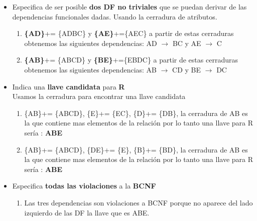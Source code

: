 \documentclass{article}
\begin{document}
\begin{enumerate}
\begin{itemize}
	\item Especifica  de ser posible \textbf{dos DF no triviales} que se puedan derivar de las dependencias funcionales dadas.
	Usando la cerradura de atributos.
	\begin{enumerate}
		\item \textbf{\{AD\}}+= \{ADBC\} y \textbf{\{AE\}}+=\{AEC\} a partir de estas cerraduras obtenemos las siguientes dependencias: AD $\rightarrow$ BC y AE $\rightarrow$ C\\ 
		\item \textbf{\{AB\}}+= \{ABCD\} y \textbf{\{BE\}}+=\{EBDC\} a partir de estas cerraduras obtenemos las siguientes dependencias: AB $\rightarrow$ CD y BE $\rightarrow$ DC\\ 
		 
		
		
	\end{enumerate}
	\item Indica una \textbf{llave candidata} para \textbf{R} \\
	Usamos la cerradura para encontrar una llave candidata
	\begin{enumerate}
		\item \{AB\}+= \{ABCD\}, \{E\}+= \{EC\}, \{D\}+= \{DB\}, la cerradura de AB es la que contiene mas elementos de la relación por lo tanto una llave para R sería : \textbf{ABE}\\ 
		\item \{AB\}+= \{ABCD\}, \{DE\}+= \{E\}, \{B\}+= \{BD\}, la cerradura de AB es la que contiene mas elementos de la relación por lo tanto una llave para R sería : \textbf{ABE}\\ 
		
		
		
	\end{enumerate}
	
	\item Especifica \textbf{todas las violaciones}  a la \textbf{BCNF}\\
	\begin{enumerate}
		\item Las tres dependencias son violaciones a BCNF porque no aparece del lado izquierdo de las DF la llave que es ABE.\\
		

\end{enumerate}
\end{itemize}
\end{enumerate}
\end{document}

